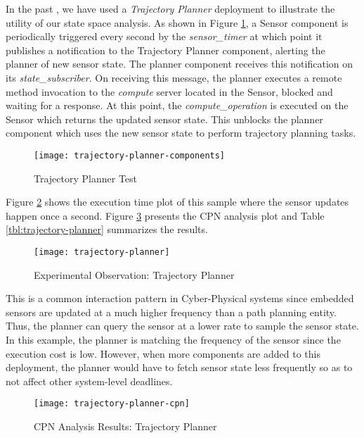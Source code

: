 In the past \cite{kumar2014colored}, we have used a \emph{Trajectory Planner} deployment to illustrate the utility of our state space analysis. As shown in Figure \ref{fig:trajectory-planner-components}, a Sensor component is periodically triggered every second by the \emph{sensor\_timer} at which point it publishes a notification to the Trajectory Planner component, alerting the planner of new sensor state. The planner component receives this notification on its \emph{state\_subscriber}. On receiving this message, the planner executes a remote method invocation to the \emph{compute} server located in the Sensor, blocked and waiting for a response. At this point, the \emph{compute\_operation} is executed on the Sensor which returns the updated sensor state. This unblocks the planner component which uses the new sensor state to perform trajectory planning tasks. 

\begin{figure}[h]
	\centering
	\texttt{[image: trajectory-planner-components]}
	\caption{Trajectory Planner Test}
	\label{fig:trajectory-planner-components}
\end{figure}
\FloatBarrier

Figure \ref{fig:trajectory-planner} shows the execution time plot of this sample where the sensor updates happen once a second. Figure \ref{fig:trajectory-planner-cpn} presents the CPN analysis plot and Table \ref{tbl:trajectory-planner} summarizes the results.

\begin{figure}[h]
	\centering
	\texttt{[image: trajectory-planner]}
	\caption{Experimental Observation: Trajectory Planner}
	\label{fig:trajectory-planner}
\end{figure}
\FloatBarrier

This is a common interaction pattern in Cyber-Physical systems since embedded sensors are updated at a much higher frequency than a path planning entity. Thus, the planner can query the sensor at a lower rate to sample the sensor state. In this example, the planner is matching the frequency of the sensor since the execution cost is low. However, when more components are added to this deployment, the planner would have to fetch sensor state less frequently so as to not affect other system-level deadlines. 

\begin{figure}[h]
	\centering
	\texttt{[image: trajectory-planner-cpn]}
	\caption{CPN Analysis Results: Trajectory Planner}
	\label{fig:trajectory-planner-cpn}
\end{figure}
\FloatBarrier


